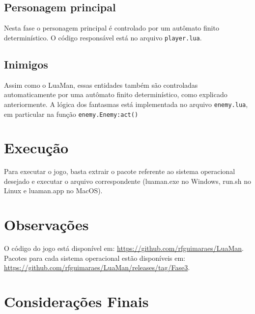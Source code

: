 \documentclass[a4paper]{scrartcl}
\begin{document}
\subsection{Personagem principal}

Nesta fase o personagem principal é controlado por um autômato finito determinístico.
O código responsável está no arquivo \texttt{player.lua}.

\subsection{Inimigos}

Assim como o LuaMan, essas entidades também são controladas automaticamente por uma autômato finito determinístico,
como explicado anteriormente. A lógica dos fantasmas está implementada no arquivo \texttt{enemy.lua}, em particular na função
\texttt{enemy.Enemy:act()}

\section{Execução}

Para executar o jogo, basta extrair o pacote referente ao sistema operacional desejado e executar o
arquivo correspondente (luaman.exe no Windows, run.sh no Linux e luaman.app no MacOS).

\section{Observações}

O código do jogo está disponível em: \url{https://github.com/rfguimaraes/LuaMan}.
Pacotes para cada sistema operacional estão disponíveis em: \url{https://github.com/rfguimaraes/LuaMan/releases/tag/Fase3}.

\section{Considerações Finais}

%
\end{document}
